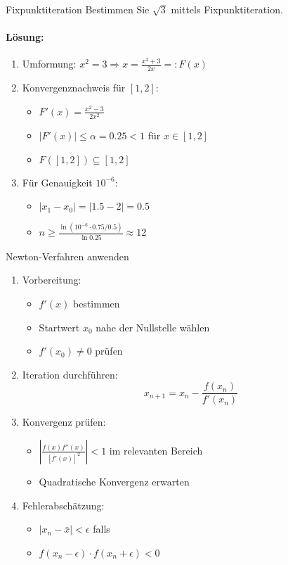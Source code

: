 \begin{example2}{Fixpunktiteration}
Bestimmen Sie $\sqrt{3}$ mittels Fixpunktiteration.

\paragraph{Lösung:}
\begin{enumerate}
    \item Umformung: $x^2 = 3 \Rightarrow x = \frac{x^2+3}{2x} =: F(x)$
    
    \item Konvergenznachweis für $[1,2]$:
    \begin{itemize}
        \item $F'(x) = \frac{x^2-3}{2x^2}$
        \item $|F'(x)| \leq \alpha = 0.25 < 1$ für $x \in [1,2]$
        \item $F([1,2]) \subseteq [1,2]$
    \end{itemize}
    
    \item Für Genauigkeit $10^{-6}$:
    \begin{itemize}
        \item $|x_1-x_0| = |1.5-2| = 0.5$
        \item $n \geq \frac{\ln(10^{-6} \cdot 0.75/0.5)}{\ln 0.25} \approx 12$
    \end{itemize}
\end{enumerate}
\end{example2}

\begin{KR}{Newton-Verfahren anwenden}
\begin{enumerate}
    \item Vorbereitung:
    \begin{itemize}
        \item $f'(x)$ bestimmen
        \item Startwert $x_0$ nahe der Nullstelle wählen
        \item $f'(x_0) \neq 0$ prüfen
    \end{itemize}
    
    \item Iteration durchführen:
    $$x_{n+1} = x_n - \frac{f(x_n)}{f'(x_n)}$$
    
    \item Konvergenz prüfen:
    \begin{itemize}
        \item $|\frac{f(x)f''(x)}{[f'(x)]^2}| < 1$ im relevanten Bereich
        \item Quadratische Konvergenz erwarten
    \end{itemize}
    
    \item Fehlerabschätzung:
    \begin{itemize}
        \item $|x_n-\bar{x}| < \epsilon$ falls
        \item $f(x_n-\epsilon) \cdot f(x_n+\epsilon) < 0$
    \end{itemize}
\end{enumerate}
\end{KR}


